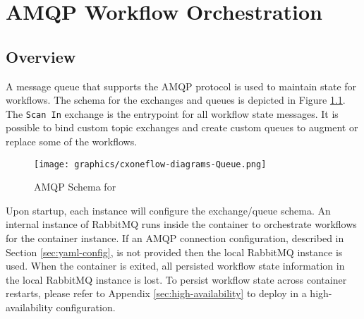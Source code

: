 \chapter{AMQP Workflow Orchestration}\label{sec:amqp-workflow-orch}



\section{Overview}

A message queue that supports the AMQP protocol is used to maintain state for \cxoneflow
workflows.  The schema for the exchanges and queues is depicted in Figure \ref{fig:amqp-schema}.
The \texttt{Scan In} exchange is the entrypoint for all workflow state messages.  It is possible
to bind custom topic exchanges and create custom queues to augment or replace some of the
workflows.


\begin{figure}[h]
    \texttt{[image: graphics/cxoneflow-diagrams-Queue.png]}
    \caption{AMQP Schema for \cxoneflow}
    \label{fig:amqp-schema}
\end{figure}


Upon startup, each \cxoneflow instance will configure the exchange/queue schema.  An
internal instance of RabbitMQ runs inside the \cxoneflow container to orchestrate
workflows for the container instance.  If an AMQP connection configuration, described in
Section \ref{sec:yaml-config}, is not provided then the local RabbitMQ instance is
used.  When the container is exited, all persisted workflow state information in the local
RabbitMQ instance is lost.  To persist workflow state across container restarts, please
refer to Appendix \ref{sec:high-availability} to deploy \cxoneflow in a
high-availability configuration.

